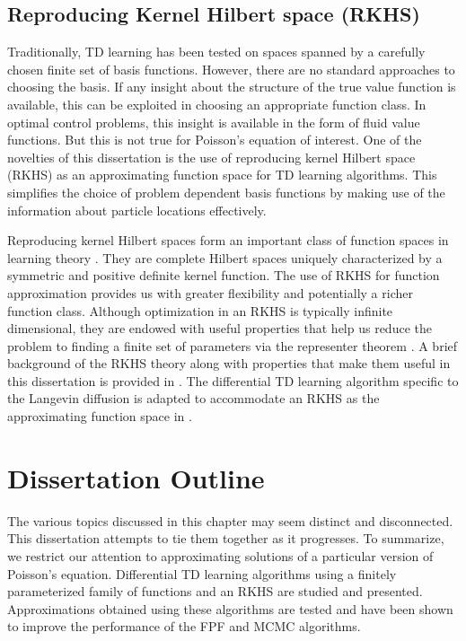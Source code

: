 \subsection{Reproducing Kernel Hilbert space (RKHS)}
\label{s:rkhs}
Traditionally, TD learning has been tested on spaces spanned by a carefully chosen finite set of basis functions. However, there are no standard approaches to choosing the basis.  If any insight about the structure of the true value function is available, this can be exploited in choosing an appropriate function class. In optimal control problems, this insight is available in the form of fluid value functions. But this is not true for Poisson's equation of interest. One of the novelties of this dissertation is the use of reproducing kernel Hilbert space (RKHS) as an approximating function space for TD learning algorithms. This simplifies the choice of problem dependent basis functions by making use of the information about particle locations effectively. 
 
Reproducing kernel Hilbert spaces form an important class of function spaces in learning theory \cite{aro50, schsmo01}. They are complete Hilbert spaces uniquely characterized by a symmetric and positive definite kernel function. The use of RKHS for function approximation provides us with greater flexibility and potentially a richer function class. Although optimization in an RKHS is typically infinite dimensional, they are endowed with useful properties that help us reduce the problem to finding a finite set of parameters via the representer theorem \cite{kimwah71, schhersmo01}. A brief background of the RKHS theory along with properties that make them useful in this dissertation is provided in . The differential TD learning algorithm specific to the Langevin diffusion is adapted to accommodate an RKHS as the approximating function space in .
 

\section{Dissertation Outline}
\label{s:outline}
The various topics discussed in this chapter may seem distinct and disconnected. This dissertation attempts to tie them together as it progresses. To summarize, we restrict our attention to approximating solutions of a particular version of Poisson's equation. Differential TD learning algorithms using a finitely parameterized family of functions and an RKHS are studied and presented. Approximations obtained using these algorithms are tested and have been shown to improve the performance of the FPF and MCMC algorithms. 

